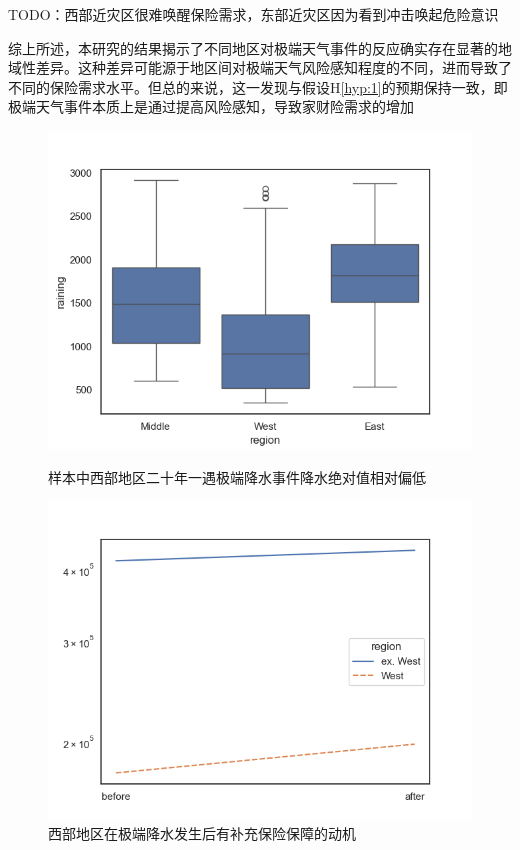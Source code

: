 TODO：西部近灾区很难唤醒保险需求，东部近灾区因为看到冲击唤起危险意识

综上所述，本研究的结果揭示了不同地区对极端天气事件的反应确实存在显著的地域性差异。这种差异可能源于地区间对极端天气风险感知程度的不同，进而导致了不同的保险需求水平。但总的来说，这一发现与假设H\ref{hyp:1}的预期保持一致，即极端天气事件本质上是通过提高风险感知，导致家财险需求的增加

\begin{figure}[htbp]
    \centering
    \begin{minipage}{0.48\linewidth}
        \includegraphics[width=\linewidth]{lib/img/rainings.png}
        \caption{样本中西部地区二十年一遇极端降水事件降水绝对值相对偏低}\label{fig:rainings}
    \end{minipage}
    \begin{minipage}{0.48\linewidth}
        \includegraphics[width=\linewidth]{lib/img/covbyregion.png}
        \caption{西部地区在极端降水发生后有补充保险保障的动机}
    \end{minipage}
\end{figure}

